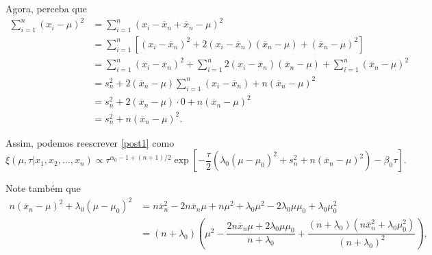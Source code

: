 \documentclass{article}
\begin{document}
Agora, perceba que
\begin{equation*}
    \begin{split}
        \sum_{i = 1}^{n} \left(x_i - \mu\right)^2 & = \sum_{i = 1}^{n} \left(x_i - \overline{x}_n + \overline{x}_n - \mu\right)^2 \\
        & = \sum_{i = 1}^{n} \left[\left(x_i - \overline{x}_n\right)^2 + 2\left(x_i - \overline{x}_n\right)\left(\overline{x}_n - \mu\right) + \left(\overline{x}_n - \mu\right)^2\right] \\
        & = \sum_{i = 1}^{n} \left(x_i - \overline{x}_n\right)^2 + \sum_{i = 1}^{n} 2\left(x_i - \overline{x}_n\right)\left(\overline{x}_n - \mu\right) + \sum_{i = 1}^{n} \left(\overline{x}_n - \mu\right)^2 \\
        & = s_n^2 + 2\left(\overline{x}_n - \mu\right)\sum_{i = 1}^{n} \left(x_i - \overline{x}_n\right) + n\left(\overline{x}_n - \mu\right)^2 \\
        & = s_n^2 + 2\left(\overline{x}_n - \mu\right)\cdot 0 + n\left(\overline{x}_n - \mu\right)^2 \\
        & = s_n^2 + n\left(\overline{x}_n - \mu\right)^2.
    \end{split}
\end{equation*}

Assim, podemos reescrever \ref{post1} como
\begin{equation}
    \label{post2}
    \xi(\mu, \tau | x_1, x_2, \dots, x_n) \propto \tau^{\alpha_0 - 1 + (n + 1)/2} \exp{\left[-\dfrac{\tau}{2}\left(\lambda_0 (\mu - \mu_0)^2 + s_n^2 + n\left(\overline{x}_n - \mu\right)^2\right) - \beta_0 \tau\right]}.
\end{equation}

Note também que
\begin{equation}
    \label{ig}
    \begin{split}
        n\left(\overline{x}_n - \mu\right)^2 + \lambda_0\left(\mu - \mu_0\right)^2 & = n\overline{x}_n^2 - 2n\overline{x}_n\mu + n\mu^2 + \lambda_0\mu^2 - 2\lambda_0\mu\mu_0 + \lambda_0\mu_0^2 \\
        & = (n + \lambda_0)\left(\mu^2 - \dfrac{2n\overline{x}_n\mu + 2\lambda_0\mu\mu_0}{n + \lambda_0} + \dfrac{\left(n + \lambda_0\right)\left(n\overline{x}_n^2 + \lambda_0\mu_0^2\right)}{\left(n + \lambda_0\right)^2}\right),
    \end{split}
\end{equation}
\end{document}
